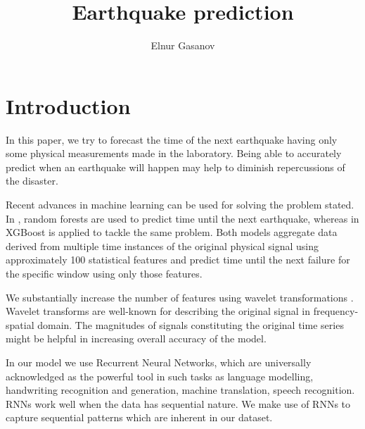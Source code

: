 \documentclass[12pt, a4paper]{article}
\author{Elnur Gasanov}
\title{Earthquake prediction}
\begin{document}
\maketitle
{}

\section{Introduction}

In this paper, we try to forecast the time of the next earthquake having only some physical measurements made in the laboratory. Being able to accurately predict when an earthquake will happen may help to diminish repercussions of the disaster.

Recent advances in machine learning can be used for solving the problem stated. In \cite{MachineLearningPredicts}, random forests are used to predict time until the next earthquake, whereas in \cite{XGBoostPaper} XGBoost is applied to tackle the same problem. Both models aggregate data derived from multiple time instances of the original physical signal using approximately 100 statistical features and predict time until the next failure for the specific window using only those features. 

We substantially increase the number of features using wavelet transformations \cite{wavelet}. Wavelet transforms are well-known for describing the original signal in frequency-spatial domain. The magnitudes of signals constituting the original time series might be helpful in increasing overall accuracy of the model.

In our model we use Recurrent Neural Networks, which are universally acknowledged as the powerful tool in such tasks as language modelling, handwriting recognition and generation, machine translation, speech recognition. RNNs work well \cite{karpathy} when the data has sequential nature. We make use of RNNs to capture sequential patterns which are inherent in our dataset.
\end{document}

